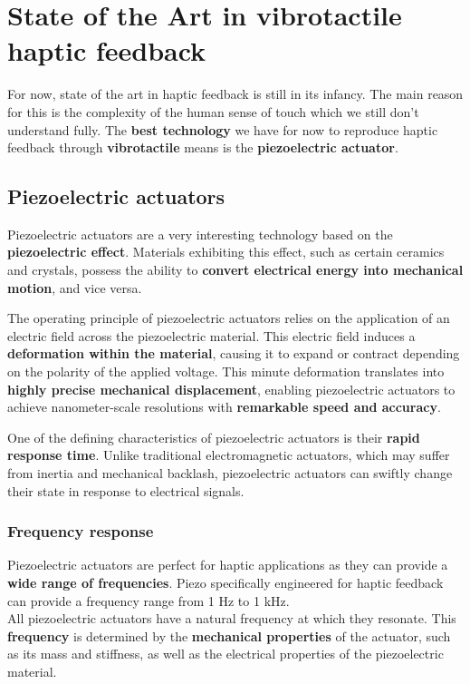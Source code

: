 \section{State of the Art in vibrotactile haptic feedback}
For now, state of the art in haptic feedback is still in its infancy.
The main reason for this is the complexity of the human sense of touch which we still don't understand fully.
The \textbf{best technology} we have for now to reproduce haptic feedback through \textbf{vibrotactile} means is the \textbf{piezoelectric actuator}.

\subsection{Piezoelectric actuators}
Piezoelectric actuators are a very interesting technology based on the \textbf{piezoelectric effect}.
Materials exhibiting this effect, such as certain ceramics and crystals, possess the ability to \textbf{convert electrical energy into mechanical motion}, and vice versa.

The operating principle of piezoelectric actuators relies on the application of an electric field across the piezoelectric material. This electric field induces a \textbf{deformation within the material}, causing it to expand or contract depending on the polarity of the applied voltage. This minute deformation translates into \textbf{highly precise mechanical displacement}, enabling piezoelectric actuators to achieve nanometer-scale resolutions with \textbf{remarkable speed and accuracy}.

One of the defining characteristics of piezoelectric actuators is their \textbf{rapid response time}. Unlike traditional electromagnetic actuators, which may suffer from inertia and mechanical backlash, piezoelectric actuators can swiftly change their state in response to electrical signals.

\subsubsection{Frequency response}
Piezoelectric actuators are perfect for haptic applications as they can provide a \textbf{wide range of frequencies}.
Piezo specifically engineered for haptic feedback can provide a frequency range from 1 Hz to 1 kHz. \\

All piezoelectric actuators have a natural frequency at which they resonate. This \textbf{frequency} is determined by the \textbf{mechanical properties} of the actuator, such as its mass and stiffness, as well as the electrical properties of the piezoelectric material.

